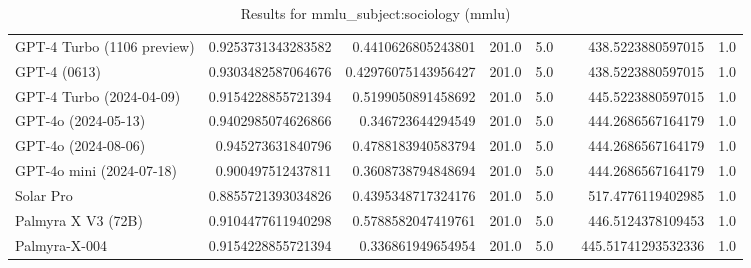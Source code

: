 \begin{table}[htp]
{\begin{tabular}{lrrrrrrr}
GPT-4 Turbo (1106 preview) & 0.9253731343283582 & 0.4410626805243801 & 201.0 & 5.0 &  & 438.5223880597015 & 1.0 \\
GPT-4 (0613) & 0.9303482587064676 & 0.42976075143956427 & 201.0 & 5.0 &  & 438.5223880597015 & 1.0 \\
GPT-4 Turbo (2024-04-09) & 0.9154228855721394 & 0.5199050891458692 & 201.0 & 5.0 &  & 445.5223880597015 & 1.0 \\
GPT-4o (2024-05-13) & 0.9402985074626866 & 0.346723644294549 & 201.0 & 5.0 &  & 444.2686567164179 & 1.0 \\
GPT-4o (2024-08-06) & 0.945273631840796 & 0.4788183940583794 & 201.0 & 5.0 &  & 444.2686567164179 & 1.0 \\
GPT-4o mini (2024-07-18) & 0.900497512437811 & 0.3608738794848694 & 201.0 & 5.0 &  & 444.2686567164179 & 1.0 \\
Solar Pro & 0.8855721393034826 & 0.4395348717324176 & 201.0 & 5.0 &  & 517.4776119402985 & 1.0 \\
Palmyra X V3 (72B) & 0.9104477611940298 & 0.5788582047419761 & 201.0 & 5.0 &  & 446.5124378109453 & 1.0 \\
Palmyra-X-004 & 0.9154228855721394 & 0.336861949654954 & 201.0 & 5.0 &  & 445.51741293532336 & 1.0 \\
\bottomrule
\end{tabular}}
\caption{Results for mmlu_subject:sociology (mmlu)}
\label{fig:mmlu_subject:sociology (mmlu)}
\end{table}